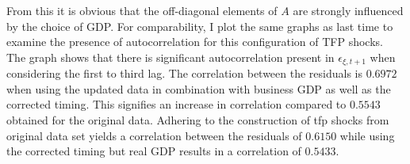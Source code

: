 From this it is obvious that the off-diagonal elements of $A$ are strongly influenced by the choice of GDP. 
For comparability, I plot the same graphs as last time to examine the presence of  autocorrelation for this configuration of TFP shocks.\\[1.5ex]


The graph shows that there is significant autocorrelation present in ${\epsilon}_{\xi,t+1}$ when considering the first to third lag.
The correlation between the residuals is $0.6972$ when using the updated data in combination with business GDP as well as the corrected timing. This signifies an increase in correlation compared to $0.5543$ obtained for the original data. Adhering to the construction of tfp shocks from original data set yields a correlation between the residuals of $0.6150$ while using the corrected timing but real GDP results in a correlation of $0.5433$.